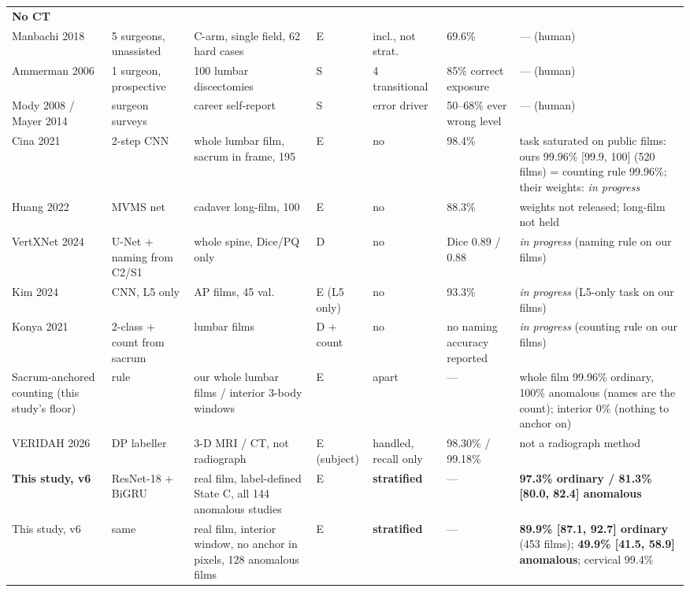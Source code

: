 \documentclass[11pt,letterpaper]{article}
\newcommand{\ci}[2]{[#1, #2]}
\begin{document}
\begin{table}[h]
{\begin{tabular}{lllllll}
\multicolumn{7}{l}{\textbf{No CT}} \\
Manbachi 2018 & 5 surgeons, unassisted & C-arm, single field, 62 hard cases & E & incl., not strat. & 69.6\% & --- (human) \\
Ammerman 2006 \citep{ammerman2006} & 1 surgeon, prospective & 100 lumbar discectomies & S & 4 transitional & 85\% correct exposure & --- (human) \\
Mody 2008 / Mayer 2014 \citep{mody2008,mayer2008} & surgeon surveys & career self-report & S & error driver & 50--68\% ever wrong level & --- (human) \\
Cina 2021 \citep{cina2021} & 2-step CNN & whole lumbar film, sacrum in frame, 195 & E & no & 98.4\% & task saturated on public films: ours 99.96\% \ci{99.9}{100} (520 films) = counting rule 99.96\%; their weights: \emph{in progress} \\
Huang 2022 \citep{huang2022} & MVMS net & cadaver long-film, 100 & E & no & 88.3\% & weights not released; long-film not held \\
VertXNet 2024 & U-Net + naming from C2/S1 & whole spine, Dice/PQ only & D & no & Dice 0.89 / 0.88 & \emph{in progress} (naming rule on our films) \\
Kim 2024 & CNN, L5 only & AP films, 45 val. & E (L5 only) & no & 93.3\% & \emph{in progress} (L5-only task on our films) \\
Konya 2021 & 2-class + count from sacrum & lumbar films & D + count & no & no naming accuracy reported & \emph{in progress} (counting rule on our films) \\
Sacrum-anchored counting (this study's floor) & rule & our whole lumbar films / interior 3-body windows & E & apart & --- & whole film 99.96\% ordinary, 100\% anomalous (names are the count); interior 0\% (nothing to anchor on) \\
VERIDAH 2026 \citep{veridah2026} & DP labeller & 3-D MRI / CT, not radiograph & E (subject) & handled, recall only & 98.30\% / 99.18\% & not a radiograph method \\ \midrule
\textbf{This study, v6} & ResNet-18 + BiGRU & real film, label-defined State C, all 144 anomalous studies & E & \textbf{stratified} & --- & \textbf{97.3\% ordinary / 81.3\% \ci{80.0}{82.4} anomalous} \\
This study, v6 & same & real film, interior window, no anchor in pixels, 128 anomalous films & E & \textbf{stratified} & --- & \textbf{89.9\% \ci{87.1}{92.7} ordinary} (453 films); \textbf{49.9\% \ci{41.5}{58.9} anomalous}; cervical 99.4\% \\

\end{tabular}}
\end{table}
\end{document}
